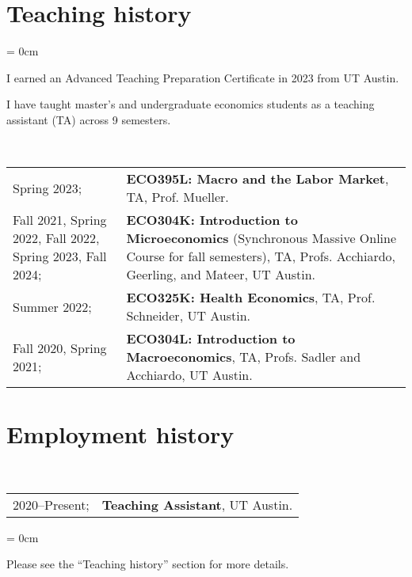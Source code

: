 \documentclass[a4paper, 10pt]{article}
\begin{document}
  \section{Teaching history}
  \begin{compactitem}\parskip = 0cm
    \item I earned an Advanced Teaching Preparation Certificate in 2023 from UT Austin.
    \item I have taught master's and undergraduate economics students as a teaching assistant (TA) across 9 semesters.
  \end{compactitem}
  \vspace*{0.70em}
  ~\begin{tabular}{p{3.5cm} p{12cm}}
    Spring 2023; & \textbf{ECO395L: Macro and the Labor Market}, TA, Prof. Mueller.\\
    Fall 2021, Spring 2022, Fall 2022, Spring 2023, Fall 2024; & \textbf{ECO304K: Introduction to Microeconomics} (Synchronous Massive Online Course for fall semesters), TA, Profs. Acchiardo, Geerling, and Mateer, UT Austin.\\
    Summer 2022; & \textbf{ECO325K: Health Economics}, TA, Prof. Schneider, UT Austin.\\
    Fall 2020, Spring 2021; & \textbf{ECO304L: Introduction to Macroeconomics}, TA, Profs. Sadler and Acchiardo, UT Austin.\\
  \end{tabular}
  \vspace*{-0.5em}

  \section{Employment history}
  ~\begin{tabular}{ll}
    2020--Present; & \textbf{Teaching Assistant}, UT Austin.
  \end{tabular}
  \begin{compactitem}\parskip = 0cm
    \item Please see the ``Teaching history'' section for more details.
  \end{compactitem}
  \vspace*{1.25em}
\end{document}
